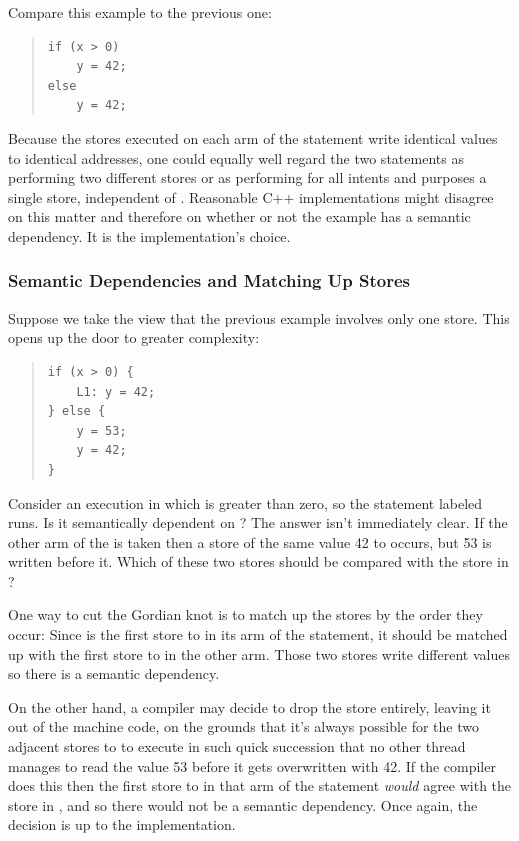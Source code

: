 \documentclass[10]{article}
\begin{document}
Compare this example to the previous one:
\begin{quote}
\begin{verbatim}
if (x > 0)
    y = 42;
else
    y = 42;
\end{verbatim}
\end{quote}
Because the stores executed on each arm of the  statement write
identical values to identical addresses, one could equally well regard
the two statements as performing two different stores or as performing
for all intents and purposes a single store, independent of .
Reasonable C++ implementations might disagree on this matter and
therefore on whether or not the example has a semantic dependency.
It is the implementation's choice.

\subsubsection{Semantic Dependencies and Matching Up Stores}
\label{sec:Semantic Dependencies and Matching Up Stores}

Suppose we take the view that the previous example involves only one
store.
This opens up the door to greater complexity:
\begin{quote}
\begin{verbatim}
if (x > 0) {
    L1: y = 42;
} else {
    y = 53;
    y = 42;
}
\end{verbatim}
\end{quote}
Consider an execution in which  is greater than zero, so the
statement labeled  runs.
Is it semantically dependent on ?
The answer isn't immediately clear.
If the other arm of the  is taken then a store of the same value 42 to
 occurs, but 53 is written before it.
Which of these two stores should be compared with the store in ?

One way to cut the Gordian knot is to match up the stores by the order
they occur:
Since  is the first store to  in its arm of the 
statement, it should be matched up with the first store to  in
the other arm.
Those two stores write different values so there is a semantic
dependency.

On the other hand, a compiler may decide to drop the  store entirely, leaving it out of the machine code,
on the grounds that it's always possible for the two adjacent stores
to  to execute in such quick succession that no other thread
manages to read the value 53 before it gets overwritten with 42.
If the compiler does this then the first store to  in that
arm of the  statement \emph{would} agree with the store in
, and so there would not be a semantic dependency.
Once again, the decision is up to the implementation.
\end{document}
